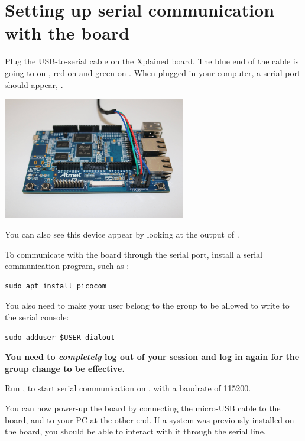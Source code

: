 \section{Setting up serial communication with the board}

Plug the USB-to-serial cable on the Xplained board. The blue end of
the cable is going to  on , red on  and
green on . When plugged in your computer, a serial port
should appear, .

\begin{center}
\includegraphics[width=8cm]{labs/sysdev-u-boot/xplained-serial-connector.jpg}
\end{center}

You can also see this device appear by looking at the output of
.

To communicate with the board through the serial port, install a
serial communication program, such as :

\begin{verbatim}
sudo apt install picocom
\end{verbatim}

You also need to make your user belong to the  group to be
allowed to write to the serial console:

\begin{verbatim}
sudo adduser $USER dialout
\end{verbatim}

{\bf You need to {\em completely} log out of your session and log in again
for the group change to be effective.}

Run , to start serial
communication on , with a baudrate of 115200.

You can now power-up the board by connecting the micro-USB cable to 
the board, and to your PC at the other end. If a system was previously
installed on the board, you should be able to interact with it
through the serial line.

